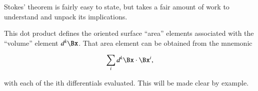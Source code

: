 %
%

Stokes' theorem is fairly easy to state, but takes a fair amount of work to understand and unpack its implications.



This dot product defines the oriented surface ``area'' elements associated with the ``volume'' element \( d^k \Bx \).  That area element can be obtained from the mnemonic

\begin{dmath}\label{eqn:stokesTheoremCore:1561}
\sum_i d^k \Bx \cdot \Bx^i,
\end{dmath}

with each of the ith differentials evaluated.  This will be made clear by example.

